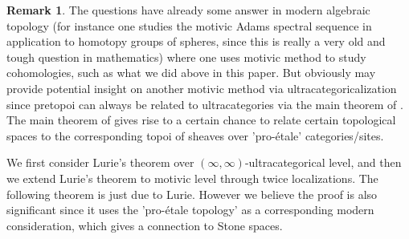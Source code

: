 \documentclass[12pt]{article}
\theoremstyle{definition}
\newtheorem{remark}{Remark}
\begin{document}
\begin{remark}
The questions have already some answer in modern algebraic topology (for instance one studies the motivic Adams spectral sequence in application to homotopy groups of spheres, since this is really a very old and tough question in mathematics) where one uses motivic method to study cohomologies, such as what we did above in this paper. But \cite{5Lu3} obviously may provide potential insight on another motivic method via ultracategoricalization since pretopoi can always be related to ultracategories via the main theorem of \cite{5Lu3}. The main theorem of \cite{5Lu3} gives rise to a certain chance to relate certain topological spaces to the corresponding topoi of sheaves over 'pro-\'etale' categories/sites.
\end{remark}




We first consider Lurie's theorem over $(\infty,\infty)$-ultracategorical level, and then we extend Lurie's theorem to motivic level through twice localizations. The following theorem is just due to Lurie. However we believe the proof is also significant since it uses the 'pro-\'etale topology' as a corresponding modern consideration, which gives a connection to Stone spaces.
\end{document}

